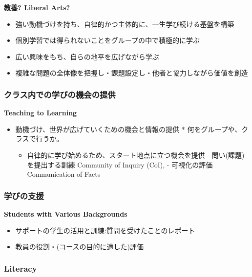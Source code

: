 \documentclass[
]{book}
\providecommand{\tightlist}{%
  \setlength{\itemsep}{0pt}\setlength{\parskip}{0pt}}
\theoremstyle{definition}
\theoremstyle{definition}
\theoremstyle{definition}
\theoremstyle{definition}
\theoremstyle{remark}
\begin{document}
\textbf{教養? Liberal Arts?}

\begin{itemize}
\tightlist
\item
  強い動機づけを持ち、自律的かつ主体的に、一生学び続ける基盤を構築
\item
  個別学習では得られないことをグループの中で積極的に学ぶ
\item
  広い興味をもち、自らの地平を広げながら学ぶ
\item
  複雑な問題の全体像を把握し・課題設定し・他者と協力しながら価値を創造
\end{itemize}

\hypertarget{ux30afux30e9ux30b9ux5185ux3067ux306eux5b66ux3073ux306eux6a5fux4f1aux306eux63d0ux4f9b}{%
\subsubsection{クラス内での学びの機会の提供}\label{ux30afux30e9ux30b9ux5185ux3067ux306eux5b66ux3073ux306eux6a5fux4f1aux306eux63d0ux4f9b}}

\textbf{Teaching to Learning}

\begin{itemize}
\tightlist
\item
  動機づけ、世界が広げていくための機会と情報の提供 * 何をグループや、クラスで行うか。

  \begin{itemize}
  \tightlist
  \item
    自律的に学び始めるため、スタート地点に立つ機会を提供 - 問い(課題)を提出する訓練 Community of Inquiry (CoI), - 可視化の評価 Communication of Facts
  \end{itemize}
\end{itemize}

\hypertarget{ux5b66ux3073ux306eux652fux63f4}{%
\subsubsection{学びの支援}\label{ux5b66ux3073ux306eux652fux63f4}}

\textbf{Students with Various Backgrounds}

\begin{itemize}
\tightlist
\item
  サポートの学生の活用と訓練:質問を受けたことのレポート
\item
  教員の役割・(コースの目的に適した)評価
\end{itemize}

\hypertarget{literacy}{%
\subsubsection{Literacy}\label{literacy}}
\end{document}
